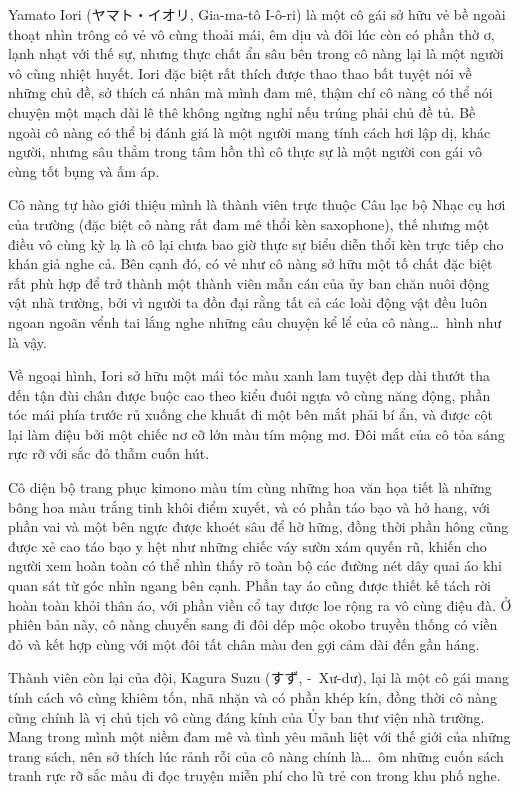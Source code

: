 \documentclass[../main.tex]{subfiles}
\begin{document}
\chrint


Yamato Iori (ヤマト・イオリ, Gia-ma-tô I-ô-ri) là một cô gái sở hữu vẻ bề ngoài thoạt nhìn trông có vẻ vô cùng thoải mái, êm dịu và đôi lúc còn có phần thờ ơ, lạnh nhạt với thế sự, nhưng thực chất ẩn sâu bên trong cô nàng lại là một người vô cùng nhiệt huyết. Iori đặc biệt rất thích được thao thao bất tuyệt nói về những chủ đề, sở thích cá nhân mà mình đam mê, thậm chí cô nàng có thể nói chuyện một mạch dài lê thê không ngừng nghỉ nếu trúng phải chủ đề tủ. Bề ngoài cô nàng có thể bị đánh giá là một người mang tính cách hơi lập dị, khác người, nhưng sâu thẳm trong tâm hồn thì cô thực sự là một người con gái vô cùng tốt bụng và ấm áp.

Cô nàng tự hào giới thiệu mình là thành viên trực thuộc Câu lạc bộ Nhạc cụ hơi của trường (đặc biệt cô nàng rất đam mê thổi kèn saxophone), thế nhưng một điều vô cùng kỳ lạ là cô lại chưa bao giờ thực sự biểu diễn thổi kèn trực tiếp cho khán giả nghe cả. Bên cạnh đó, có vẻ như cô nàng sở hữu một tố chất đặc biệt rất phù hợp để trở thành một thành viên mẫn cán của ủy ban chăn nuôi động vật nhà trường, bởi vì người ta đồn đại rằng tất cả các loài động vật đều luôn ngoan ngoãn vểnh tai lắng nghe những câu chuyện kể lể của cô nàng\dots\ hình như là vậy.

Về ngoại hình, Iori sở hữu một mái tóc màu xanh lam tuyệt đẹp dài thướt tha đến tận đùi chân được buộc cao theo kiểu đuôi ngựa vô cùng năng động, phần tóc mái phía trước rủ xuống che khuất đi một bên mắt phải bí ẩn, và được cột lại làm điệu bởi một chiếc nơ cỡ lớn màu tím mộng mơ. Đôi mắt của cô tỏa sáng rực rỡ với sắc đỏ thẫm cuốn hút.

Cô diện bộ trang phục kimono màu tím cùng những hoa văn họa tiết là những bông hoa màu trắng tinh khôi điểm xuyết, và có phần táo bạo và hở hang, với phần vai và một bên ngực được khoét sâu để hờ hững, đồng thời phần hông cũng được xẻ cao táo bạo y hệt như những chiếc váy sườn xám quyến rũ, khiến cho người xem hoàn toàn có thể nhìn thấy rõ toàn bộ các đường nét dây quai áo khi quan sát từ góc nhìn ngang bên cạnh. Phần tay áo cũng được thiết kế tách rời hoàn toàn khỏi thân áo, với phần viền cổ tay được loe rộng ra vô cùng điệu đà. Ở phiên bản này, cô nàng chuyển sang đi đôi dép mộc okobo truyền thống có viền đỏ và kết hợp cùng với một đôi tất chân màu đen gợi cảm dài đến gần háng.


Thành viên còn lại của đội, Kagura Suzu (すず, -\ Xư-dư), lại là một cô gái mang tính cách vô cùng khiêm tốn, nhã nhặn và có phần khép kín, đồng thời cô nàng cũng chính là vị chủ tịch vô cùng đáng kính của Ủy ban thư viện nhà trường. Mang trong mình một niềm đam mê và tình yêu mãnh liệt với thế giới của những trang sách, nên sở thích lúc rảnh rỗi của cô nàng chính là\dots\ ôm những cuốn sách tranh rực rỡ sắc màu đi đọc truyện miễn phí cho lũ trẻ con trong khu phố nghe.
\end{document}
